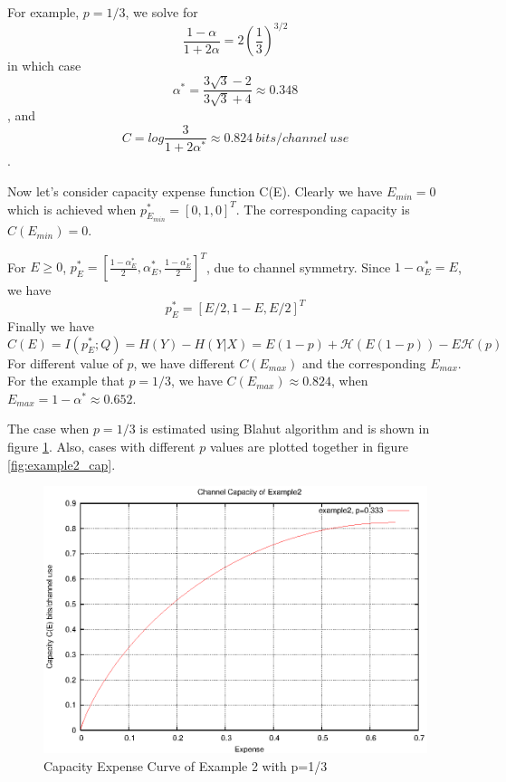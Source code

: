 \documentclass[a4paper,10pt]{article}
\begin{document}
For example, $p=1/3$, we solve for
\begin{equation}
 \frac{1-\alpha}{1+2\alpha}=2\left(\frac{1}{3}\right)^{3/2}
\end{equation}
in which case
\[\alpha^*=\frac{3\sqrt{3}-2}{3\sqrt{3}+4}\approx0.348\],
and 
\[C=log{\frac{3}{1+2\alpha^*}}\approx0.824\ bits/channel\ use\].

Now let's consider capacity expense function C(E). Clearly we have $E_{min}=0$ which is achieved when $p_{E_{min}}^*=[0,1,0]^T$. The corresponding capacity is $C(E_{min})=0$.

For $E\geq0$, $p_E^*=[\frac{1-\alpha_E^*}{2},\alpha_E^*,\frac{1-\alpha_E^*}{2}]^T$, due to channel symmetry. Since $1-\alpha_E^*=E$, we have
\begin{equation}
 p_E^*=[E/2,1-E,E/2]^T
\end{equation}
Finally we have
\begin{equation}
 C(E)=I(p_E^*;Q)=H(Y)-H(Y|X)=E(1-p)+\mathcal{H}(E(1-p))-E\mathcal{H}(p)
\end{equation}
For different value of $p$, we have different $C(E_{max})$ and the corresponding $E_{max}$. For the example that $p=1/3$, we have $C(E_{max})\approx0.824$, when $E_{max}=1-\alpha^*\approx0.652$. 

The case when $p=1/3$ is estimated using Blahut algorithm and is shown in figure \ref{fig:example2_p0.3}. Also, cases with different $p$ values are plotted together in figure \ref{fig:example2_cap}.

\begin{figure}
 \centering
 \includegraphics{pic/example2_cap_p0.3.eps}
 \caption{Capacity Expense Curve of Example 2 with p=1/3}
 \label{fig:example2_p0.3}
\end{figure}
\end{document}
